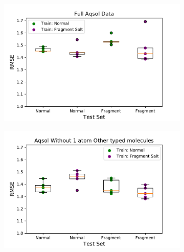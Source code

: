 \documentclass[journal=jmcmar,manuscript=article]{achemso}
\begin{document}
\begin{figure}[tb]
    \centering
    \begin{subfigure}[t]{0.48\textwidth}
        \centering
        \includegraphics[width=\linewidth]{figures/full_saltfragfirst_RMSEs_boxplots.pdf}
    \end{subfigure}%
    \hfill
    \begin{subfigure}[t]{0.48\textwidth}
        \centering
        \includegraphics[width=\linewidth]{figures/others2plus_saltfragfirst_RMSEs_boxplots.pdf}
    \end{subfigure}
    

\end{figure}
\end{document}
